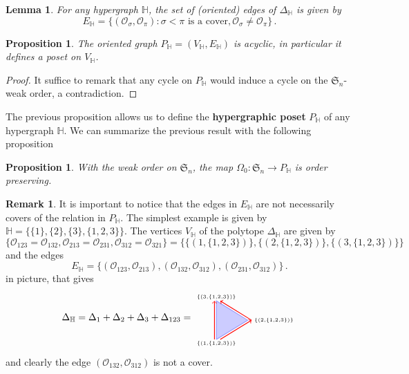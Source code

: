 \documentclass[reqno]{amsart}
\newtheorem{proposition}[theorem]{Proposition}
\newtheorem{lemma}[theorem]{Lemma}
\theoremstyle{definition}
\newtheorem{remark}[theorem]{Remark}
\newcommand{\defn}[1]{\textbf{\textsf{\color{PineGreen} #1}}} %
\newcommand{\fS}{\mathfrak{S}} %
\newcommand{\Or}{\mathcal O}  %
\newcommand{\HH}{\mathbb H}  %
\begin{document}
\begin{lemma}\label{lem:Hedges}
For any hypergraph $\HH$, the set of (oriented) edges of $\Delta_{\HH}$ is given by 
 $$E_{\HH}=\{(\Or_\sigma,\Or_\pi): \sigma<\pi \text{ is a cover}, \Or_\sigma\ne\Or_\pi\}\,.$$
\end{lemma}

\begin{proposition}\label{prop:PHisOrder}
The oriented graph $P_{\HH}=(V_{\HH},E_{\HH})$ is acyclic, in particular it defines a poset on $V_{\HH}$.
\end{proposition}

\begin{proof} It suffice to remark that any cycle on $P_{\HH}$ would induce a cycle on the $\fS_n$-weak order, a contradiction.
\end{proof}

The previous proposition allows us to define the \defn{hypergraphic poset} $P_{\HH}$ of any hypergraph $\HH$.  
We can summarize the previous result with the following proposition

\begin{proposition}\label{prop:WeakToP}
With the weak order on $\fS_n$, the map $\Omega_0 \colon \fS_n \to P_{\HH}$ is order preserving.
\end{proposition}



\begin{remark}\label{rem:EdgeNotCover}
It is important to notice that the edges in $E_{\HH}$ are not necessarily covers of the relation in $P_{\HH}$. The simplest example is given by $\HH=\big\{\{1\},\{2\},\{3\},\{1,2,3\}\big\}$.
The vertices $V_{\HH}$ of the polytope $\Delta_{\HH}$ are given by
	$$\Big\{ \Or_{123}=\Or_{132}, \Or_{213}=\Or_{231}, \Or_{312}=\Or_{321}\Big\}= \Big\{ \big\{(1,\{1,2,3\})\big\},\big\{(2,\{1,2,3\})\big\},\big\{(3,\{1,2,3\})\big\}\Big\}$$
and the edges
	$$ E_{\HH}=\big\{ (\Or_{123},\Or_{213}),(\Or_{132},\Or_{312}),(\Or_{231}, \Or_{312})\big\}\,.$$
in picture, that gives
$$\Delta_\HH=\Delta_1+\Delta_2+\Delta_3+\Delta_{123}=
\begin{tikzpicture}[scale=.7,baseline=.0cm]
	\node (a) at (0,-1.2) {$\scriptscriptstyle \{(1,\{1,2,3\})\}$};
	\node (b) at (3,0) {$\scriptscriptstyle \{(2,\{1,2,3\})\}$};
	\node (c) at (0,1.2) {$\scriptscriptstyle \{(3,\{1,2,3\})\}$};
	\draw [color=blue!40,thick,fill=blue!20] (0,-1)--(0,1)--(1.632,0)--(0,-1) ; 
	\draw [color=red,thick,->] (-.1,-1)--(-.1,1); 
	\draw [color=red,thick,->] (1.832,0)--(.2,1); 
	\draw [color=red,thick,->] (.2,-1)--(1.832,0); 
\end{tikzpicture}
$$
and clearly the edge $(\Or_{132},\Or_{312})$ is not a cover. 
\end{remark}
\end{document}
